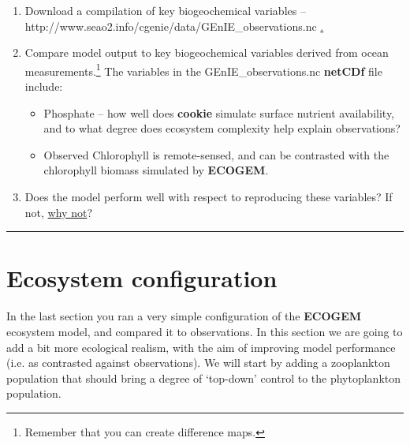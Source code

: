 \vspace{1mm}
\begin{enumerate}[noitemsep]
\vspace{1mm}
\item Download a compilation of key biogeochemical variables -- \\\textsf{\footnotesize http://www.seao2.info/cgenie/data/GEnIE\_observations.nc} \href{http://www.seao2.info/cgenie/data/GEnIE_observations.nc}.
\vspace{1mm}
\item Compare model output to key biogeochemical variables derived from ocean measurements.\footnote{Remember that you can create difference maps.}  The variables in the \textsf{\footnotesize GEnIE\_observations.nc} \textbf{netCDf} file include:
\vspace{1mm}
\begin{itemize}[noitemsep]
\item Phosphate -- how well does \textbf{cookie} simulate surface nutrient availability, and to what degree does ecosystem complexity help explain observations?
\item Observed Chlorophyll is remote-sensed, and can be contrasted with the chlorophyll biomass simulated by \textbf{ECOGEM}.
\end{itemize}
\vspace{1mm}
\item Does the model perform well with respect to reproducing these variables? If not, \uline{why not}?
\end{enumerate}
\vspace{2mm}

\vspace{1mm}\noindent\rule{4cm}{0.5pt}\vspace{2mm}

\newpage

\section{Ecosystem configuration}

In the last section you ran a very simple configuration of the \textbf{ECOGEM} ecosystem model, and compared it to observations. In this section we are going to add a bit more ecological realism, with the aim of improving model performance (i.e. as contrasted against observations). We will start by adding a zooplankton population that  should bring a degree of `top-down' control to the phytoplankton population. 
\vspace{2mm}

